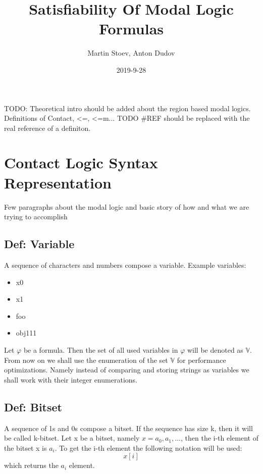 \documentclass{article}
\title{Satisfiability Of Modal Logic Formulas}
\date{2019-9-28}
\author{Martin Stoev, Anton Dudov}
\begin{document}
	\maketitle
	\newpage

	\tableofcontents

	\newpage
	TODO: Theoretical intro should be added about the region based modal logics.
	Definitions of Contact, <=, <=m...
	\newline
	TODO \#REF should be replaced with the real reference of a definiton.
	\newpage
	\section{Contact Logic Syntax Representation}
	Few paragraphs about the modal logic and basic story of how and what we are trying to accomplish	
	\subsection*{Def: Variable}
		A sequence of characters and numbers compose a variable.
	\newline
	\newline
	Example variables:
	\begin{itemize}
		\item x0
		\item x1
		\item foo
		\item obj111
	\end{itemize} 
	Let $\varphi$ be a formula. Then the set of all used variables in $\varphi$ will be denoted as $\mathbb{V}$.
	From now on we shall use the enumeration of the set $\mathbb{V}$ for performance optimizations.
	Namely instead of comparing and storing strings as variables we shall work with their integer enumerations.

	\subsection*{Def: Bitset}
		A sequence of 1s and 0s compose a bitset. If the sequence has size k, then it will be called k-bitset.
		\newline
		\newline
		Let x be a bitset, namely $x = a_0, a_1, ...$, then the i-th element of the bitset x is $a_i$. 
		To get the i-th element the following notation will be used:
		\begin{equation}
			x[i]
		\end{equation}
		which returns the $a_i$ element.
\end{document}
